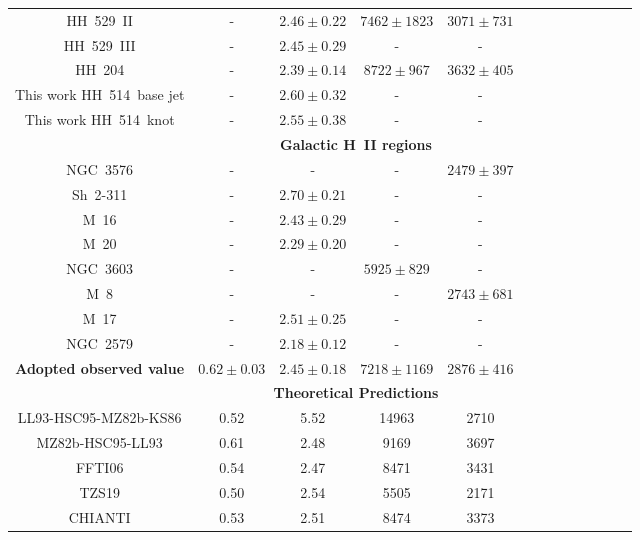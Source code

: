 \documentclass[fleqn,usenatbib]{mnras}
\begin{document}
\begin{table}
\begin{tabular}{ccccccccccccc}
\citet{mendez2021} HH~529~II &-&$2.46 \pm 0.22$&$7462 \pm 1823$&$3071 \pm 731$\\

\citet{mendez2021} HH~529~III &-&$2.45 \pm 0.29$ & - & -\\


\citet{mendez2021-2} HH~204 & - & $2.39 \pm 0.14$ & $8722 \pm 967$ & $3632 \pm 405$\\

This work HH~514~base jet & - & $2.60 \pm 0.32$ &-&-\\

This work HH~514~knot & - & $2.55 \pm 0.38$ &-&-\\

 & \multicolumn{4}{c}{{\bf Galactic H~II regions}}\\

\citet{garciarojas04} NGC~3576 & -& - & - & $2479 \pm 397$ \\

\citet{garciarojas05} Sh~2-311& - & $2.70\pm 0.21$&-&-\\

\citet{garciarojas06} M~16 &-&$ 2.43\pm 0.29$&-&-\\

\citet{garciarojas06} M~20 & -& $ 2.29\pm 0.20$&-&-\\

\citet{garciarojas06} NGC~3603 & - & - & $5925 \pm 829$ & - \\

\citet{garciarojas07-2} M~8 &-& - &- & $2743 \pm 681$  \\

\citet{garciarojas07-2} M~17 &-& $2.51 \pm 0.25$ &-&-\\

\citet{Esteban13} NGC~2579 &- &$2.18 \pm 0.12$ &-&-\\



{\bf Adopted observed value} & \boldmath $0.62 \pm 0.03$ & \boldmath $2.45 \pm 0.18$& \boldmath$ 7218\pm 1169$ & \boldmath $2876\pm416$\\

 & \multicolumn{4}{c}{{\bf Theoretical Predictions}}\\

LL93-HSC95-MZ82b-KS86 &0.52& 5.52&14963&2710\\

MZ82b-HSC95-LL93  & 0.61 & 2.48 &9169&3697\\

FFTI06 &0.54& 2.47&8471&3431\\

TZS19 & 0.50 & 2.54&5505&2171\\

CHIANTI & 0.53 & 2.51&8474&3373\\

\hline
\end{tabular}
\end{table}
\end{document}
